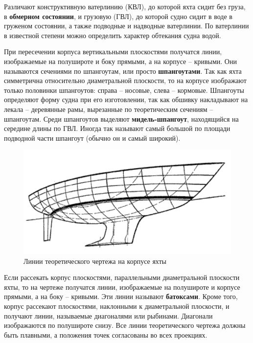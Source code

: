 \documentclass[a4paper, 12pt, twoside, final]{scrbook}
\begin{document}
Различают конструктивную ватерлинию (КВЛ), до которой яхта сидит без груза, в \textbf{обмерном состоянии}, и грузовую (ГВЛ), до которой судно сидит в воде в груженом состоянии, а также подводные и надводные ватерлинии. По ватерлинии в известной степени можно определить характер обтекания судна водой.

При пересечении корпуса вертикальными плоскостями получатся линии, изображаемые на полушироте и боку прямыми, а на корпусе \--- кривыми. Они называются сечениями по шпангоутам, или просто \textbf{шпангоутами}. Так как яхта симметрична относительно диаметральной плоскости, то на корпусе изображают только половинки шпангоутов: справа \--- носовые, слева \--- кормовые. Шпангоуты определяют форму судна при его изготовлении, так как обшивку накладывают на лекала \--- деревянные рамы, вырезанные по теоретическим сечениям \--- шпангоутам. Среди шпангоутов выделяют \textbf{мидель-шпангоут}, находящийся на середине длины по ГВЛ. Иногда так называют самый большой по площади подводной части шпангоут (обычно он и самый широкий).

\begin{figure}[htbp]
   \centering
   \includegraphics{pics/86_Linii_teor_chertezha} %
   \caption{Линии теоретического чертежа на корпусе яхты}
   \label{fig:86}
\end{figure}

Если рассекать корпус плоскостями, параллельными диаметральной плоскости яхты, то на чертеже получатся линии, изображаемые на полушироте и корпусе прямыми, а на боку \--- кривыми. Эти линии называют \textbf{батоксами}. Кроме того, корпус рассекают плоскостями, наклонными к диаметральной плоскости, и получают линии, называемые диагоналями или рыбинами. Диагонали изображаются по полушироте снизу.
Все линии теоретического чертежа должны быть плавными, а положения точек согласованы во всех проекциях.
\end{document}
